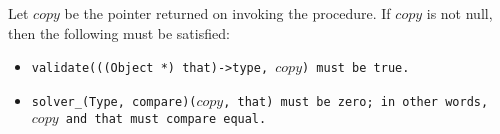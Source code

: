 Let $copy$ be the pointer returned on invoking the procedure.
If  $copy$ is not null, then the following must be satisfied:

\begin{itemize}[nosep]

\item \tt{validate(((Object *) that)->type,} $copy$\tt{)} must be \tt{true}.

\item \tt{solver_(Type, compare)(}$copy$\tt{, that)} must be zero;
in other words, $copy$ and \tt{that} must compare equal.

\end{itemize}
